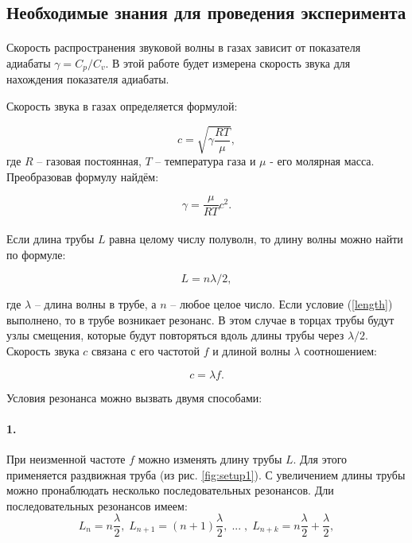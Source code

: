 \documentclass[a4paper,12pt]{article} %
\begin{document}
\subsection{Необходимые знания для проведения эксперимента}

\paragraph{}
Скорость распространения звуковой волны в газах зависит от показателя адиабаты $\gamma = C_p/C_v $. В этой работе будет измерена скорость звука для нахождения показателя адиабаты.

Скорость звука в газах определяется формулой:

\[
c = \sqrt{\gamma \frac{RT}{\mu}}, 
\]
\noindent где $R$ -- газовая постоянная, $T$ -- температура газа и $\mu$ - его молярная масса. Преобразовав формулу найдём:

\begin{equation}
\gamma = \frac{\mu}{RT} c^2. \label{gamma}
\end{equation}

\paragraph{}
Если длина трубы $L$ равна целому числу полуволн, то длину волны можно найти по формуле:

\begin{equation}
L = n \lambda / 2, \label{length}
\end{equation}

\noindent где  $\lambda$ -- длина волны в трубе, а $n$ -- любое целое число. Если условие (\ref{length}) выполнено, то в трубе возникает резонанс. В этом случае в торцах трубы будут узлы смещения, которые будут повторяться вдоль длины трубы через $\lambda /2 $. Скорость звука $c$ связана с его частотой $f$ и длиной волны $\lambda$ соотношением:

\begin{equation}
c = \lambda f. \label{speed}
\end{equation}

Условия резонанса можно вызвать двумя способами:

\paragraph{1.} При неизменной частоте $f$ можно изменять длину трубы $L$. Для этого применяется раздвижная труба (из рис. \ref{fig:setup1}). С увеличением длины трубы можно пронаблюдать несколько последовательных резонансов. Дли последовательных резонансов имеем:
\[
L_n = n \frac{\lambda}{2}, \; L_{n+1} = (n+1) \frac{\lambda}{2}, \;
... \;, \; L_{n + k} = n \frac{\lambda}{2} + \frac{\lambda}{2},
\]
\end{document}
